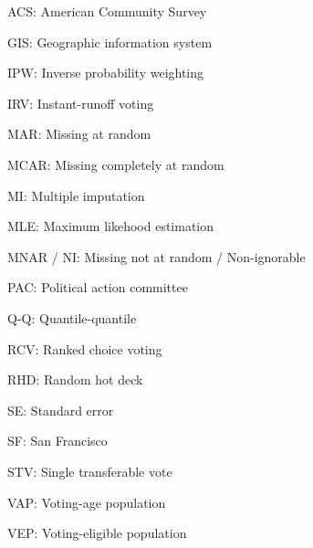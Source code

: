 \documentclass[12pt,twoside]{reedthesis}
\begin{document}
  \begin{abbrevs}
    \noindent ACS: American Community Survey
    
    \par
    
    \noindent GIS: Geographic information system
    
    \par
    
    \noindent IPW: Inverse probability weighting
    
    \par
    
    \noindent IRV: Instant-runoff voting
    
    \par
    
    \noindent MAR: Missing at random
    
    \par
    
    \noindent MCAR: Missing completely at random
    
    \par
    
    \noindent MI: Multiple imputation
    
    \par
    
    \noindent MLE: Maximum likehood estimation
    
    \par
    
    \noindent MNAR / NI: Missing not at random / Non-ignorable
    
    \par
    
    \noindent PAC: Political action committee
    
    \par
    
    \noindent Q-Q: Quantile-quantile
    
    \par
    
    \noindent RCV: Ranked choice voting
    
    \par
    
    \noindent RHD: Random hot deck
    
    \par
    
    \noindent SE: Standard error
    
    \par
    
    \noindent SF: San Francisco
    
    \par
    
    \noindent STV: Single transferable vote
    
    \par
    
    \noindent VAP: Voting-age population
    
    \par
    
    \noindent VEP: Voting-eligible population
    
    \par
  \end{abbrevs}
\end{document}
